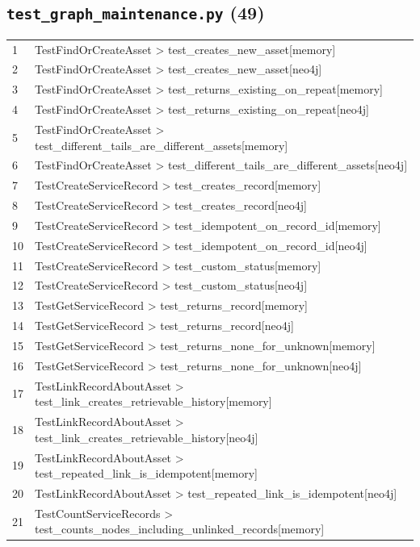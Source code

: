 \subsection*{\texttt{test\_graph\_maintenance.py} (49)}
\begin{longtable}{p{}p{}}
1 & TestFindOrCreateAsset > test\_creates\_new\_asset[memory] \\
2 & TestFindOrCreateAsset > test\_creates\_new\_asset[neo4j] \\
3 & TestFindOrCreateAsset > test\_returns\_existing\_on\_repeat[memory] \\
4 & TestFindOrCreateAsset > test\_returns\_existing\_on\_repeat[neo4j] \\
5 & TestFindOrCreateAsset > test\_different\_tails\_are\_different\_assets[memory] \\
6 & TestFindOrCreateAsset > test\_different\_tails\_are\_different\_assets[neo4j] \\
7 & TestCreateServiceRecord > test\_creates\_record[memory] \\
8 & TestCreateServiceRecord > test\_creates\_record[neo4j] \\
9 & TestCreateServiceRecord > test\_idempotent\_on\_record\_id[memory] \\
10 & TestCreateServiceRecord > test\_idempotent\_on\_record\_id[neo4j] \\
11 & TestCreateServiceRecord > test\_custom\_status[memory] \\
12 & TestCreateServiceRecord > test\_custom\_status[neo4j] \\
13 & TestGetServiceRecord > test\_returns\_record[memory] \\
14 & TestGetServiceRecord > test\_returns\_record[neo4j] \\
15 & TestGetServiceRecord > test\_returns\_none\_for\_unknown[memory] \\
16 & TestGetServiceRecord > test\_returns\_none\_for\_unknown[neo4j] \\
17 & TestLinkRecordAboutAsset > test\_link\_creates\_retrievable\_history[memory] \\
18 & TestLinkRecordAboutAsset > test\_link\_creates\_retrievable\_history[neo4j] \\
19 & TestLinkRecordAboutAsset > test\_repeated\_link\_is\_idempotent[memory] \\
20 & TestLinkRecordAboutAsset > test\_repeated\_link\_is\_idempotent[neo4j] \\
21 & TestCountServiceRecords > test\_counts\_nodes\_including\_unlinked\_records[memory] \\

\end{longtable}
